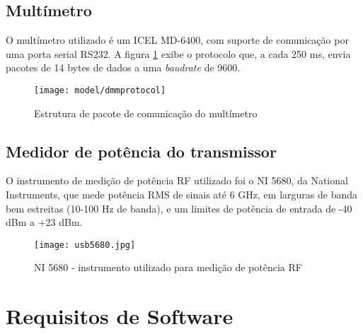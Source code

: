     \subsection{Multímetro}
        
        O multímetro utilizado é um ICEL MD-6400, com suporte de comunicação por uma porta serial RS232. A figura \ref{fig:dmmprotocol} exibe o protocolo que, a cada 250 ms, envia pacotes de 14 bytes de dados a uma \textit{baudrate} de 9600. 
          \begin{figure}[ht]
                \centering
                \texttt{[image: model/dmmprotocol]}
                \caption{Estrutura de pacote de comunicação do multímetro}
                \label{fig:dmmprotocol}
            \end{figure}
    
    \subsection{Medidor de potência do transmissor}
    \label{instruni}
        O instrumento de medição de potência RF utilizado foi o NI 5680, da National Instruments, que mede potência RMS de sinais até 6 GHz, em larguras de banda bem estreitas (10-100 Hz de banda), e um limites de potência de entrada de -40 dBm a +23 dBm.

        \begin{figure}
            \centering
            \texttt{[image: usb5680.jpg]}
            \caption{NI 5680 - instrumento utilizado para medição de potência RF}
            \label{fig:ni5680}
        \end{figure}
    
        
        
    
\section{Requisitos de Software}

